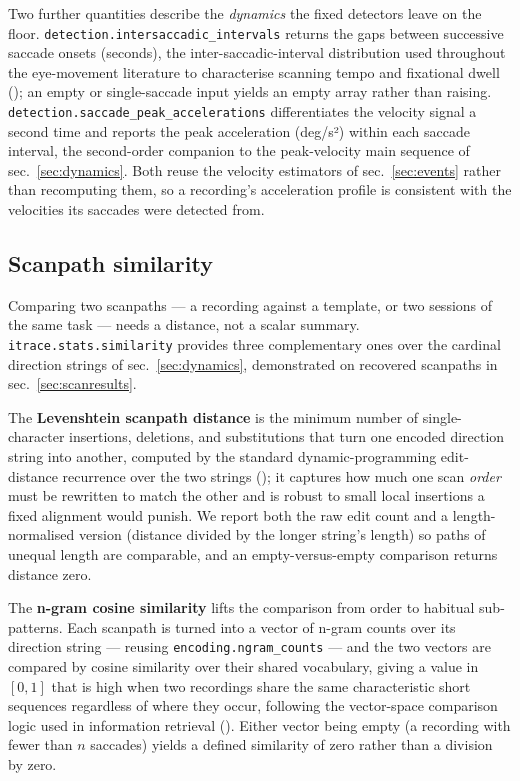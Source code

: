 \documentclass[
]{article}
\begin{document}
Two further quantities describe the \emph{dynamics} the fixed detectors
leave on the floor. \texttt{detection.intersaccadic\_intervals} returns
the gaps between successive saccade onsets (seconds), the
inter-saccadic-interval distribution used throughout the eye-movement
literature to characterise scanning tempo and fixational dwell
(); an empty or
single-saccade input yields an empty array rather than raising.
\texttt{detection.saccade\_peak\_accelerations} differentiates the
velocity signal a second time and reports the peak acceleration (deg/s²)
within each saccade interval, the second-order companion to the
peak-velocity main sequence of sec.~\ref{sec:dynamics}. Both reuse the
velocity estimators of sec.~\ref{sec:events} rather than recomputing
them, so a recording's acceleration profile is consistent with the
velocities its saccades were detected from.

\subsection{Scanpath similarity}\label{scanpath-similarity}

Comparing two scanpaths --- a recording against a template, or two
sessions of the same task --- needs a distance, not a scalar summary.
\texttt{itrace.stats.similarity} provides three complementary ones over
the cardinal direction strings of sec.~\ref{sec:dynamics}, demonstrated
on recovered scanpaths in sec.~\ref{sec:scanresults}.

The \textbf{Levenshtein scanpath distance} is the minimum number of
single-character insertions, deletions, and substitutions that turn one
encoded direction string into another, computed by the standard
dynamic-programming edit-distance recurrence over the two strings
(); it captures
how much one scan \emph{order} must be rewritten to match the other and
is robust to small local insertions a fixed alignment would punish. We
report both the raw edit count and a length-normalised version (distance
divided by the longer string's length) so paths of unequal length are
comparable, and an empty-versus-empty comparison returns distance zero.

The \textbf{n-gram cosine similarity} lifts the comparison from order to
habitual sub-patterns. Each scanpath is turned into a vector of n-gram
counts over its direction string --- reusing
\texttt{encoding.ngram\_counts} --- and the two vectors are compared by
cosine similarity over their shared vocabulary, giving a value in
\([0, 1]\) that is high when two recordings share the same
characteristic short sequences regardless of where they occur, following
the vector-space comparison logic used in information retrieval
(). Either
vector being empty (a recording with fewer than \(n\) saccades) yields a
defined similarity of zero rather than a division by zero.
\end{document}
